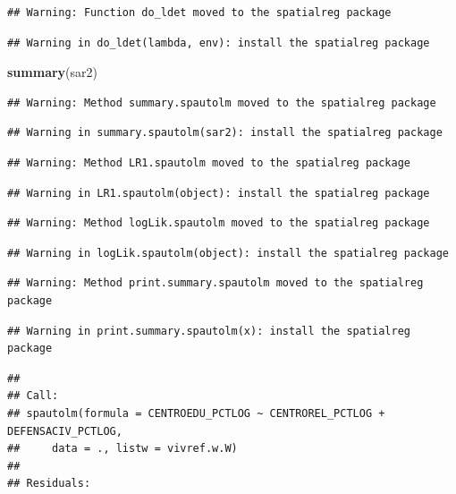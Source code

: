 \documentclass[11pt,]{article}
\newenvironment{Shaded}{\begin{snugshade}}{\end{snugshade}}
\newcommand{\KeywordTok}[1]{\textcolor[rgb]{0.13,0.29,0.53}{\textbf{#1}}}
\newcommand{\NormalTok}[1]{#1}
\begin{document}
\begin{verbatim}
## Warning: Function do_ldet moved to the spatialreg package
\end{verbatim}

\begin{verbatim}
## Warning in do_ldet(lambda, env): install the spatialreg package
\end{verbatim}

\begin{Shaded}
\begin{Highlighting}[]
\KeywordTok{summary}\NormalTok{(sar2)}
\end{Highlighting}
\end{Shaded}

\begin{verbatim}
## Warning: Method summary.spautolm moved to the spatialreg package
\end{verbatim}

\begin{verbatim}
## Warning in summary.spautolm(sar2): install the spatialreg package
\end{verbatim}

\begin{verbatim}
## Warning: Method LR1.spautolm moved to the spatialreg package
\end{verbatim}

\begin{verbatim}
## Warning in LR1.spautolm(object): install the spatialreg package
\end{verbatim}

\begin{verbatim}
## Warning: Method logLik.spautolm moved to the spatialreg package
\end{verbatim}

\begin{verbatim}
## Warning in logLik.spautolm(object): install the spatialreg package
\end{verbatim}

\begin{verbatim}
## Warning: Method print.summary.spautolm moved to the spatialreg package
\end{verbatim}

\begin{verbatim}
## Warning in print.summary.spautolm(x): install the spatialreg package
\end{verbatim}

\begin{verbatim}
## 
## Call: 
## spautolm(formula = CENTROEDU_PCTLOG ~ CENTROREL_PCTLOG + DEFENSACIV_PCTLOG, 
##     data = ., listw = vivref.w.W)
## 
## Residuals:
\end{verbatim}
\end{document}
